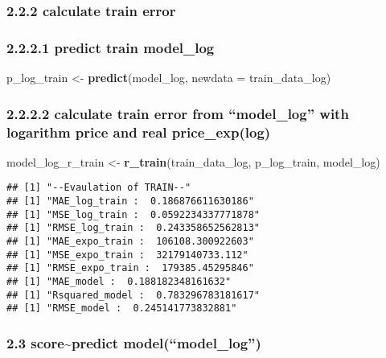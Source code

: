 \documentclass[
]{article}
\newenvironment{Shaded}{\begin{snugshade}}{\end{snugshade}}
\newcommand{\AttributeTok}[1]{\textcolor[rgb]{0.13,0.29,0.53}{#1}}
\newcommand{\FunctionTok}[1]{\textcolor[rgb]{0.13,0.29,0.53}{\textbf{#1}}}
\newcommand{\NormalTok}[1]{#1}
\newcommand{\OtherTok}[1]{\textcolor[rgb]{0.56,0.35,0.01}{#1}}
\begin{document}
\hypertarget{calculate-train-error}{%
\subsubsection{2.2.2 calculate train
error}\label{calculate-train-error}}

\hypertarget{predict-train-model_log}{%
\subsubsection{2.2.2.1 predict train
model\_log}\label{predict-train-model_log}}

\begin{Shaded}
\begin{Highlighting}[]
\NormalTok{p\_log\_train }\OtherTok{\textless{}{-}} \FunctionTok{predict}\NormalTok{(model\_log, }\AttributeTok{newdata =}\NormalTok{ train\_data\_log)}
\end{Highlighting}
\end{Shaded}

\hypertarget{calculate-train-error-from-model_log-with-logarithm-price-and-real-price_explog}{%
\subsubsection{2.2.2.2 calculate train error from ``model\_log'' with
logarithm price and real
price\_exp(log)}\label{calculate-train-error-from-model_log-with-logarithm-price-and-real-price_explog}}

\begin{Shaded}
\begin{Highlighting}[]
\NormalTok{model\_log\_r\_train }\OtherTok{\textless{}{-}} \FunctionTok{r\_train}\NormalTok{(train\_data\_log, p\_log\_train, model\_log)}
\end{Highlighting}
\end{Shaded}

\begin{verbatim}
## [1] "--Evaulation of TRAIN--"
## [1] "MAE_log_train :  0.186876611630186"
## [1] "MSE_log_train :  0.0592234337771878"
## [1] "RMSE_log_train :  0.243358652562813"
## [1] "MAE_expo_train :  106108.300922603"
## [1] "MSE_expo_train :  32179140733.112"
## [1] "RMSE_expo_train :  179385.45295846"
## [1] "MAE_model :  0.188182348161632"
## [1] "Rsquared_model :  0.783296783181617"
## [1] "RMSE_model :  0.245141773832881"
\end{verbatim}

\hypertarget{scorepredict-modelmodel_log}{%
\subsubsection{2.3 score\textasciitilde predict
model(``model\_log'')}\label{scorepredict-modelmodel_log}}
\end{document}
